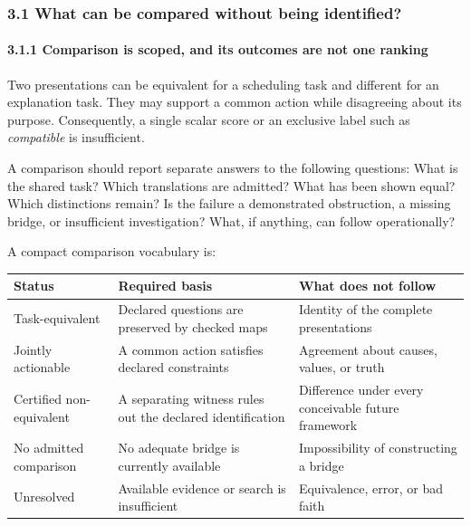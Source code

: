 \documentclass[
  10pt,
]{article}
\begin{document}
\subsubsection{3.1 What can be compared without being identified?}\label{what-can-be-compared-without-being-identified}

\paragraph{3.1.1 Comparison is scoped, and its outcomes are not one ranking}\label{comparison-is-scoped-and-its-outcomes-are-not-one-ranking}

Two presentations can be equivalent for a scheduling task and different for an explanation task. They may support a common action while disagreeing about its purpose. Consequently, a single scalar score or an exclusive label such as \emph{compatible} is insufficient.

A comparison should report separate answers to the following questions: What is the shared task? Which translations are admitted? What has been shown equal? Which distinctions remain? Is the failure a demonstrated obstruction, a missing bridge, or insufficient investigation? What, if anything, can follow operationally?

A compact comparison vocabulary is:

\begin{longtable}[]{@{}
  >{\raggedright\arraybackslash}p{}
  >{\raggedright\arraybackslash}p{}
  >{\raggedright\arraybackslash}p{}@{}}
\toprule\noalign{}
\begin{minipage}[b]{\linewidth}\raggedright
Status
\end{minipage} & \begin{minipage}[b]{\linewidth}\raggedright
Required basis
\end{minipage} & \begin{minipage}[b]{\linewidth}\raggedright
What does not follow
\end{minipage} \\
\midrule\noalign{}
\endhead
\bottomrule\noalign{}
\endlastfoot
Task-equivalent & Declared questions are preserved by checked maps & Identity of the complete presentations \\
Jointly actionable & A common action satisfies declared constraints & Agreement about causes, values, or truth \\
Certified non-equivalent & A separating witness rules out the declared identification & Difference under every conceivable future framework \\
No admitted comparison & No adequate bridge is currently available & Impossibility of constructing a bridge \\
Unresolved & Available evidence or search is insufficient & Equivalence, error, or bad faith \\
\end{longtable}
\end{document}
